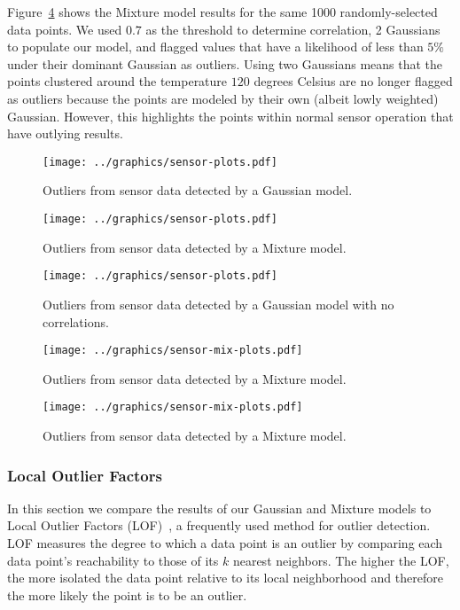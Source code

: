 Figure~\ref{fig:sensors_3} shows the Mixture model results for the same 1000 randomly-selected data points. 
We used $0.7$ as the threshold to determine correlation, 2 Gaussians to populate our model, and flagged values that have a likelihood of less than $5\%$ under their dominant Gaussian as outliers.
Using two Gaussians means that the points clustered around the temperature $120$ degrees Celsius are no longer flagged as outliers because the points are modeled by their own (albeit lowly weighted) Gaussian.
However, this highlights the points within normal sensor operation that have outlying results.
 

\begin{figure}[h]
\centering
\texttt{[image: ../graphics/sensor-plots.pdf]}
\caption{Outliers from sensor data detected by a Gaussian model.}
\label{fig:sensors_1}
\end{figure}
\begin{figure}[h]
\centering
\texttt{[image: ../graphics/sensor-plots.pdf]}
\caption{Outliers from sensor data detected by a Mixture model.}
\label{fig:sensors_2}
\end{figure}
\begin{figure}[h]
\centering
\texttt{[image: ../graphics/sensor-plots.pdf]}
\caption{Outliers from sensor data detected by a Gaussian model with no correlations.}
\label{fig:sensors_nocorr}
\end{figure}
\begin{figure}[h]
\centering
\texttt{[image: ../graphics/sensor-mix-plots.pdf]}
\caption{Outliers from sensor data detected by a Mixture model.}
\label{fig:sensors_3}
\end{figure}
\begin{figure}[h]
\centering
\texttt{[image: ../graphics/sensor-mix-plots.pdf]}
\caption{Outliers from sensor data detected by a Mixture model.}
\label{fig:sensors_4}
\end{figure}

\subsubsection{Local Outlier Factors}
\label{sec:lof-evaluation}

In this section we compare the results of our Gaussian and Mixture models to Local Outlier Factors (LOF)~\cite{Breunig2000}, a frequently used method for outlier detection.
LOF measures the degree to which a data point is an outlier by comparing each data point's reachability to those of its $k$ nearest neighbors.
The higher the LOF, the more isolated the data point relative to its local neighborhood and therefore the more likely the point is to be an outlier.

